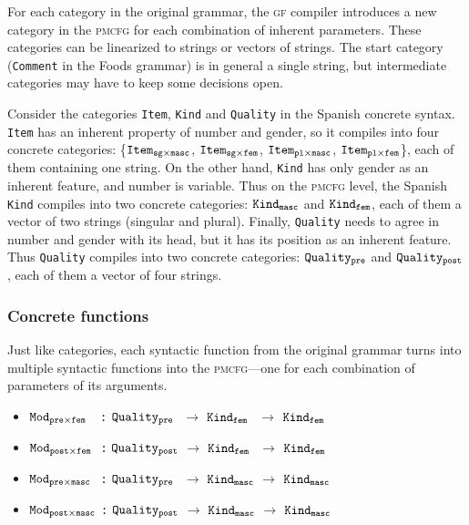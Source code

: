 \documentclass[runningheads]{llncs}
\def\t#1{\texttt{#1}}
\def\gf{\textsc{gf}}
\def\pmcfg{\textsc{pmcfg}}
\newcommand{\quality}[1]{${\tt Quality_{#1}}$}
\newcommand{\kind}[1]{${\tt Kind_{#1}}$}
\newcommand{\mod}[2]{${\tt Mod_{#1\times#2}}$}
\newcommand{\itemSpa}[2]{${\tt Item_{#1\times#2}}$}
\newcommand{\itemEng}[1]{${\tt Item_{#1}}$}
\begin{document}
For each category in the original grammar, the \gf{} compiler
introduces a new category in the \pmcfg{} for each combination of
inherent parameters.  
These categories can be linearized to strings or vectors of
strings. The start category (\t{Comment} in the Foods grammar) is in
general a single string, but intermediate categories may have to keep
some decisions open. 

Consider the categories \t{Item}, \t{Kind} and \t{Quality} in the
Spanish concrete syntax. \t{Item} has an inherent property of number
and gender, so it compiles into four
concrete categories: \{\itemSpa{sg}{masc}, \itemSpa{sg}{fem},
\itemSpa{pl}{masc}, \itemSpa{pl}{fem}\}, each of them containing one string.
On the other hand, \t{Kind} has only gender as an inherent feature,
and number is variable. Thus on the \pmcfg{} level, the Spanish
\t{Kind} compiles into two concrete categories: \kind{masc} and
\kind{fem}, each of them a vector of two strings (singular and plural).
Finally, \t{Quality} needs to agree in number and gender
with its head, but it has its position as an inherent feature. 
Thus \t{Quality} compiles into two concrete categories: \quality{pre} and
\quality{post}, each of them a vector of four strings.

\subsubsection{Concrete functions}
Just like categories, each syntactic function from the original
grammar turns into multiple syntactic functions into the
\pmcfg{}---one for each combination of parameters of its arguments.

\begin{itemize}
\item \mod{pre}{fem~~} \t{:} \quality{pre~} $\rightarrow$ \kind{fem~} $\rightarrow$ \kind{fem}
\item  \mod{post}{fem~} \t{:} \quality{post} $\rightarrow$ \kind{fem~} $\rightarrow$ \kind{fem}
\item  \mod{pre}{masc~~}\t{:} \quality{pre~} $\rightarrow$ \kind{masc} $\rightarrow$ \kind{masc}
\item \mod{post}{masc} \t{:} \quality{post} $\rightarrow$ \kind{masc} $\rightarrow$ \kind{masc}
\end{itemize}
\end{document}
